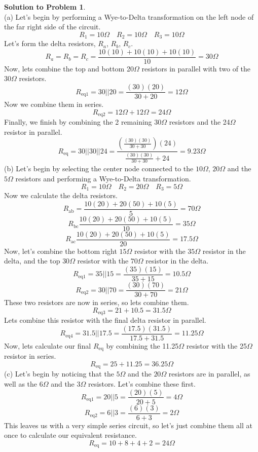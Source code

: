 \documentclass[11pt,letterpaper]{article}
\theoremstyle{definition}
\newtheorem{solprob}{\textcolor{solproblemcolor}{Solution to Problem}}  %
\begin{document}
\begin{solprob} \text{}\\
    (a) Let's begin by performing a Wye-to-Delta transformation on the left node of the far right side of the circuit.
    \[R_1 = 10\Omega \,\,\,\,\,\, R_2 = 10\Omega\,\,\,\,\,\, R_3 = 10\Omega\]
    Let's form the delta resistors, $R_a$, $R_b$, $R_c$.
    \[R_a = R_b = R_c = \frac{10(10) + 10(10) + 10(10)}{10} = 30\Omega\]
    Now, lets combine the top and bottom 20$\Omega$ resistors in parallel with two of the 30$\Omega$ resistors.
    \[R_\text{eq1} = 30||20 = \frac{(30)(20)}{30 + 20} = 12\Omega\]
    Now we combine them in series.
    \[R_\text{eq2} = 12\Omega + 12\Omega = 24\Omega\]
    Finally, we finish by combining the 2 remaining 30$\Omega$ resistors and the 24$\Omega$ resistor in parallel.
    \[R_\text{eq} = 30||30||24 = \frac{(\frac{(30)(30)}{30 + 30})(24)}{\frac{(30)(30)}{30 + 30}+24} = 9.23\Omega\]
    (b) Let's begin by selecting the center node connected to the $10\Omega$, $20\Omega$ and the $5\Omega$ resistors and performing a Wye-to-Delta transformation.
    \[R_1 = 10\Omega \,\,\,\,\,\, R_2 = 20\Omega\,\,\,\,\,\, R_3 = 5\Omega\]
    Now we calculate the delta resistors.
    \[R_\text{ab} = \frac{10(20) + 20(50) + 10(5)}{5} = 70\Omega\]
    \[R_\text{bc} \frac{10(20) + 20(50) + 10(5)}{10} = 35\Omega\]
    \[R_\text{ac} \frac{10(20) + 20(50) + 10(5)}{20} = 17.5\Omega\]
    Now, let's combine the bottom right $15\Omega$ resistor with the $35\Omega$ resistor in the delta, and the top $30\Omega$ resistor with the $70\Omega$ resistor in the delta.
    \[R_\text{eq1} = 35||15 = \frac{(35)(15)}{35+15} = 10.5\Omega\]
    \[R_\text{eq2} = 30||70 = \frac{(30)(70)}{30 + 70} = 21\Omega\]
    These two resistors are now in series, so lets combine them.
    \[R_\text{eq3} = 21 + 10.5 = 31.5\Omega\]
    Lets combine this resistor with the final delta resistor in parallel.
    \[R_\text{eq4} = 31.5||17.5 = \frac{(17.5)(31.5)}{17.5 + 31.5} = 11.25\Omega\]
    Now, lets calculate our final $R_\text{eq}$ by combining the 11.25$\Omega$ resistor with the 25$\Omega$ resistor in series.
    \[R_\text{eq} = 25 + 11.25 = 36.25\Omega\]
    (c) Let's begin by noticing that the $5\Omega$ and the $20\Omega$ resistors are in parallel, as well as the $6\Omega$ and the $3\Omega$ resistors.  Let's combine these first.
    \[R_\text{eq1} = 20||5 = \frac{(20)(5)}{20+5} = 4\Omega\]
    \[R_\text{eq2} = 6||3 = \frac{(6)(3)}{6+3} = 2\Omega\]
    This leaves us with a very simple series circuit, so let's just combine them all at once to calculate our equivalent resistance.
    \[R_\text{eq} = 10 + 8 + 4 + 2 = 24\Omega\]
\end{solprob}
\end{document}
